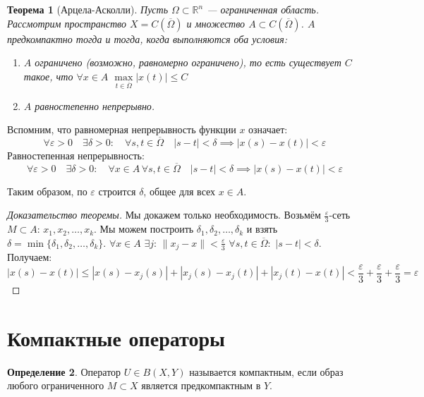 \documentclass[11pt,openany,a4paper]{scrartcl}
\theoremstyle{plain}
\newtheorem{theorem}{Теорема}[section]
\theoremstyle{definition}
\newtheorem{definition}[theorem]{Определение}
\newcommand\mb{\mathbb}
\newcommand\real{\mb R}
\newcommand\ol{\overline}
\begin{document}
\begin{theorem}[Арцела-Асколли]
    Пусть $\Omega \subset \real^n$ — ограниченная область. Рассмотрим пространство
    $X = C(\ol \Omega)$ и множество $A \subset C(\ol \Omega)$.
    $A$ предкомпактно тогда и тогда, когда выполняются оба условия:
    \begin{enumerate}
        \item $A$ ограничено (возможно, равномерно ограничено), то есть существует $C$
        такое, что $\forall x\in A$ $\max\limits_{t \in \ol \Omega}|x(t)| \leqslant C$
        \item $A$ равностепенно непрерывно.
    \end{enumerate}
\end{theorem}

Вспомним, что равномерная непрерывность функции $x$ означает:
$$
\forall \varepsilon > 0\quad \exists\delta > 0:\quad \forall s,t \in \ol \Omega\quad
|s - t| < \delta \implies |x(s) - x(t)| < \varepsilon
$$
Равностепенная непрерывность:
$$
\forall \varepsilon > 0\quad \exists\delta > 0:\quad \forall x\in A\,
\forall s,t \in \ol \Omega\quad |s-t|< \delta \implies |x(s) - x(t)| < \varepsilon
$$

Таким образом, по $\varepsilon$ строится $\delta$, общее для всех $x \in A$.

\begin{proof}[Доказательство теоремы]
    Мы докажем только необходимость. Возьмём $\frac{\varepsilon}{3}$-сеть $M\subset A$:
    $x_1, x_2, \ldots, x_k$. Мы можем построить $\delta_1, \delta_2,\ldots,\delta_k$ и взять
    $\delta = \min\{\delta_1, \delta_2,\ldots,\delta_k\}$.
    $\forall x\in A$ $\exists j$: $\|x_j - x\| < \frac{\varepsilon}{3}$
    $\forall s,t\in\ol \Omega:$ $|s-t|<\delta$. Получаем:
    $$
    |x(s) - x(t)| \leqslant |x(s) - x_j(s)| + |x_j(s) - x_j(t)| + |x_j(t) - x(t)| <
    \frac{\varepsilon}{3} + \frac{\varepsilon}{3} + \frac{\varepsilon}{3} = \varepsilon
    $$
\end{proof}

\section{Компактные операторы}

\begin{definition}
    Оператор $U \in B(X, Y)$ называется компактным, если образ любого ограниченного
    $M \subset X$ является предкомпактным в $Y$.
\end{definition}
\end{document}
